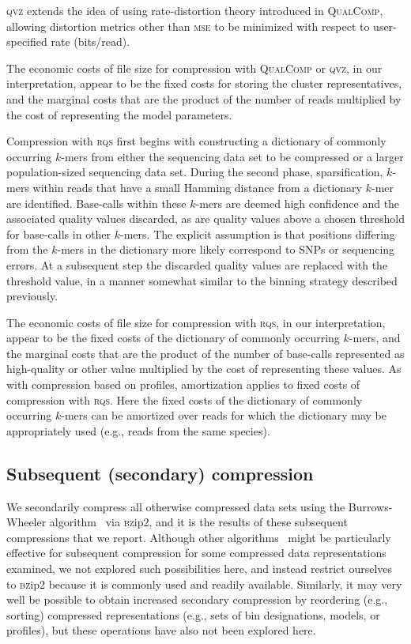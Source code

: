 \documentclass[fleqn,10pt,lineno]{wlpeerj} %
\begin{document}
\textsc{qvz} extends the idea of using rate-distortion theory
introduced in \textsc{QualComp}, allowing distortion metrics other
than \textsc{mse} to be minimized with respect to user-specified rate
(bits/read).

The economic costs of file size for compression with \textsc{QualComp}
or \textsc{qvz}, in our interpretation, appear to be the fixed costs
for storing the cluster representatives, and the marginal costs that
are the product of the number of reads multiplied by the cost of
representing the model parameters.

Compression with \textsc{rqs} first begins with constructing a
dictionary of commonly occurring $k$-mers from either the sequencing
data set to be compressed or a larger population-sized sequencing
data set. During the second phase, sparsification, $k$-mers within
reads that have a small Hamming distance from a dictionary $k$-mer are
identified. Base-calls within these $k$-mers are deemed high
confidence and the associated quality values discarded, as are quality
values above a chosen threshold for base-calls in other $k$-mers. The
explicit assumption is that positions differing from the $k$-mers in
the dictionary more likely correspond to SNPs or sequencing errors. At
a subsequent step the discarded quality values are replaced with the
threshold value, in a manner somewhat similar to the binning strategy
described previously.

The economic costs of file size for compression with \textsc{rqs}, in
our interpretation, appear to be the fixed costs of the dictionary of
commonly occurring $k$-mers, and the marginal costs that are the
product of the number of base-calls represented as high-quality or
other value multiplied by the cost of representing these values. As
with compression based on profiles, amortization applies to fixed
costs of compression with \textsc{rqs}. Here the fixed costs of the
dictionary of commonly occurring $k$-mers can be amortized over reads
for which the dictionary may be appropriately used (e.g., reads from
the same species).

\subsection*{Subsequent (secondary) compression}

We secondarily compress all otherwise compressed data sets using the
Burrows-Wheeler algorithm~\citep{bwt} via \textsc{bz}ip2, and it is the
results of these subsequent compressions that we report. Although
other algorithms~\cite[e.g.,][]{HUFFMAN:1952nr,Ziv77auniversal,
  DBLP:journals/tit/ZivL78} might be particularly effective for
subsequent compression for some compressed data representations
examined, we not explored such possibilities here, and instead
restrict ourselves to \textsc{bz}ip2 because it is commonly used and
readily available. Similarly, it may very well be possible to obtain
increased secondary compression by reordering (e.g., sorting)
compressed representations (e.g., sets of bin designations, models, or
profiles), but these operations have also not been explored here.
\end{document}
